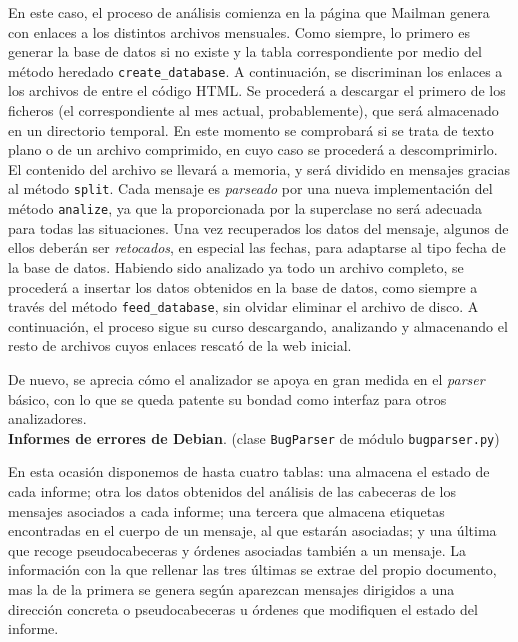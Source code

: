 En este caso, el proceso de análisis comienza en la página que Mailman genera
con enlaces a los distintos archivos mensuales. Como siempre, lo primero es
generar la base de datos si no existe y la tabla correspondiente por medio
del método heredado \texttt{create\_database}. A continuación, se discriminan
los enlaces a los archivos de entre el código HTML. Se procederá a descargar
el primero de los ficheros (el correspondiente al mes actual, probablemente),
que será almacenado en un directorio temporal. En este momento se comprobará
si se trata de texto plano o de un archivo comprimido, en cuyo caso se
procederá a descomprimirlo. El contenido del archivo se llevará a memoria,
y será dividido en mensajes gracias al método \texttt{split}. Cada mensaje es
\textit{parseado} por una nueva implementación del método \texttt{analize}, ya
que la proporcionada por la superclase no será adecuada para todas las situaciones.
Una vez recuperados los datos del mensaje, algunos de ellos deberán ser \textit{retocados},
en especial las fechas, para adaptarse al tipo fecha de la base de datos.
Habiendo sido analizado ya todo un archivo completo, se procederá a insertar
los datos obtenidos en la base de datos, como siempre a través del método
\texttt{feed\_database}, sin olvidar eliminar el archivo de disco.
A continuación, el proceso sigue su curso descargando,
analizando y almacenando el resto de archivos cuyos enlaces rescató de la web
inicial.

De nuevo, se aprecia cómo el analizador se apoya en gran medida en el \textit{parser}
básico, con lo que se queda patente su bondad como interfaz para otros analizadores.\\

\noindent \textbf{Informes de errores de Debian}. (clase \texttt{BugParser}
de módulo \texttt{bugparser.py})

En esta ocasión disponemos de hasta cuatro tablas: una
almacena el estado de cada informe; otra los datos obtenidos del análisis de
las cabeceras de los mensajes asociados a cada informe; una tercera que almacena
etiquetas encontradas en el cuerpo de un mensaje, al que estarán asociadas;
y una última que recoge pseudocabeceras y órdenes asociadas también a un mensaje.
La información con la que rellenar las tres últimas se extrae del propio
documento, mas la de la primera se genera según aparezcan mensajes dirigidos
a una dirección concreta o pseudocabeceras u órdenes que modifiquen el estado
del informe.

